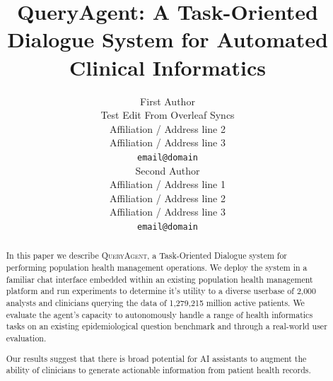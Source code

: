 \documentclass[11pt]{article}
\title{QueryAgent: A Task-Oriented Dialogue System for Automated Clinical Informatics}
\author{First Author \\
  Test Edit From Overleaf Syncs \\
  Affiliation / Address line 2 \\
  Affiliation / Address line 3 \\
  \texttt{email@domain} \\\And
  Second Author \\
  Affiliation / Address line 1 \\
  Affiliation / Address line 2 \\
  Affiliation / Address line 3 \\
  \texttt{email@domain} \\}
\begin{document}



\maketitle
\begin{abstract}
In this paper we describe \textsc{QueryAgent,} a Task-Oriented Dialogue system for performing population health management operations.
We deploy the system in a familiar chat interface embedded within an existing population health management platform and run experiments to determine it's utility to a diverse userbase of 2,000 analysts and clinicians querying the data of 1,279,215 million active patients.
We evaluate the agent's capacity to autonomously handle a range of health informatics tasks on an existing epidemiological question benchmark and through a real-world user evaluation.

Our results suggest that there is broad potential for AI assistants to augment the ability of clinicians to generate actionable information
from patient health records.




\end{abstract}
\end{document}
